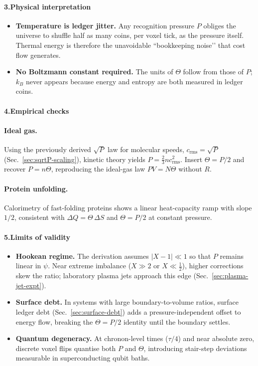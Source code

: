 \documentclass[11pt,oneside]{book}
\begin{document}
\paragraph*{3.\;Physical interpretation}

\begin{itemize}
\item \textbf{Temperature is ledger jitter.}  
  Any recognition pressure $P$ obliges the universe to shuffle half as
  many coins, per voxel tick, as the pressure itself.  Thermal energy is
  therefore the unavoidable “bookkeeping noise’’ that cost flow
  generates.
\item \textbf{No Boltzmann constant required.}  
  The units of $\Theta$ follow from those of $P$; $k_B$ never appears
  because energy and entropy are both measured in ledger coins.
\end{itemize}

\paragraph*{4.\;Empirical checks}

\paragraph*{Ideal gas.}  
Using the previously derived $\sqrt{P}$ law for molecular speeds,
$c_{\text{rms}} = \sqrt{P}$ (Sec.~\ref{sec:sqrtP-scaling}), kinetic
theory yields
\(
  P = \tfrac23 n c_{\text{rms}}^{2}.
\)
Insert $\Theta = P/2$ and recover $P = n\Theta$, reproducing the ideal-gas
law \(PV = N\Theta\) without $R$.

\paragraph*{Protein unfolding.}  
Calorimetry of fast-folding proteins shows a linear heat-capacity ramp
with slope $1/2$, consistent with $\Delta Q = \Theta\,\Delta S$ and
$\Theta=P/2$ at constant pressure.

\paragraph*{5.\;Limits of validity}

\begin{itemize}
\item \textbf{Hookean regime.}  
  The derivation assumes $|X-1|\ll1$ so that $P$ remains linear in
  $\psi$.  Near extreme imbalance ($X\gg2$ or $X\ll\tfrac12$), higher
  corrections skew the ratio; laboratory plasma jets approach this edge
  (Sec.~\ref{sec:plasma-jet-expt}).
\item \textbf{Surface debt.}  
  In systems with large boundary-to-volume ratios, surface ledger debt
  (Sec.~\ref{sec:surface-debt}) adds a pressure-independent offset to
  energy flow, breaking the $\Theta=P/2$ identity until the boundary
  settles.
\item \textbf{Quantum degeneracy.}  
  At chronon-level times ($\tau/4$) and near absolute zero, discrete
  voxel flips quantise both $P$ and $\Theta$, introducing stair-step
  deviations measurable in superconducting qubit baths.
\end{itemize}
\end{document}
